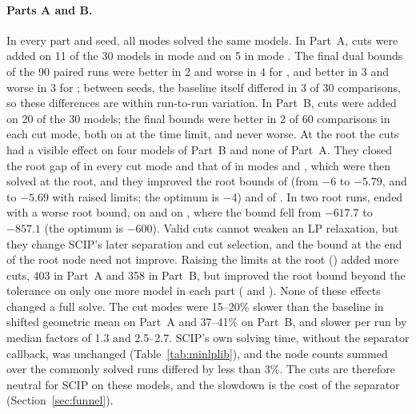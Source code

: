 \paragraph{Parts A and B.} In every part and seed, all modes solved the same
models. In Part~A, cuts were added on 11 of the 30 models in mode 
and on 5 in mode . The final dual bounds of the 90 paired runs were
better in 2 and worse in 4 for , and better in 3 and worse in 3 for
; between seeds, the baseline itself differed in 3 of 30
comparisons, so these differences are within run-to-run variation. In
Part~B, cuts were added on 20 of the 30 models; the final bounds were better
in 2 of 60 comparisons in each cut mode, both on  at
the time limit, and never worse. At the root the cuts had a visible effect on
four models of Part~B and none of Part~A. They closed the root gap of
 in every cut mode and that of
 in modes  and , which were
then solved at the root, and they improved the root bounds of 
(from $-6$ to $-5.79$, and to $-5.69$ with raised limits; the optimum is $-4$)
and of . In two root runs,  ended with a worse root
bound, on  and on , where the bound
fell from $-617.7$ to $-857.1$ (the optimum is $-600$). Valid cuts cannot
weaken an LP relaxation, but they change SCIP's later separation and cut
selection, and the bound at the end of the root node need not improve.
Raising the limits at the root () added more cuts, 403 in
Part~A and 358 in Part~B, but improved the root bound beyond the tolerance on
only one more model in each part ( and
). None of these effects changed a full solve. The cut
modes were 15--20\% slower than the baseline in shifted geometric mean on
Part~A and 37--41\% on Part~B, and slower per run by median factors of 1.3 and
2.5--2.7. SCIP's own solving time, without the separator callback, was
unchanged (Table~\ref{tab:minlplib}), and the node counts summed over the
commonly solved runs differed by less than 3\%. The cuts are therefore neutral
for SCIP on these models, and the slowdown is the cost of the separator
(Section~\ref{sec:funnel}).

